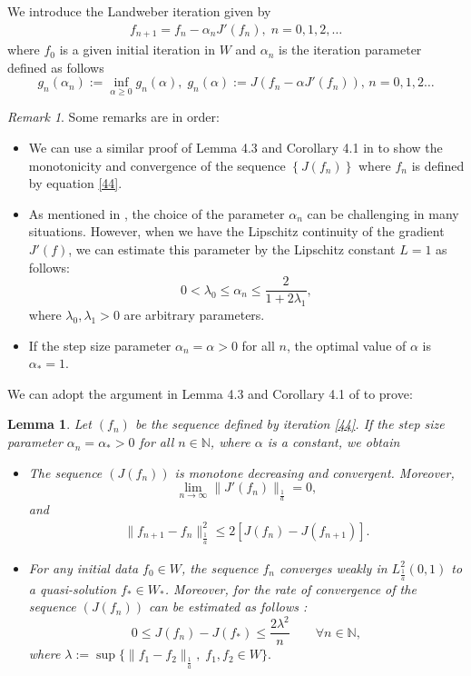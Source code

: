 \documentclass[reqno]{amsart}
\theoremstyle{plain}
\newtheorem{lemma}[theorem]{Lemma}
\theoremstyle{remark}
\newtheorem{remark}[theorem]{Remark}
\numberwithin{equation}{section}
\begin{document}
We introduce the Landweber iteration given by
\begin{align}\label{44}
     f_{n+1}=f_{n}-\alpha_n J'(f_n), \; n=0,1,2, \dots
\end{align}
where $f_0$ is a given initial iteration in $W$ and $ \alpha_n$ is the iteration parameter defined as follows
$$ g_n(\alpha_n):=\inf_{\alpha \geq 0}g_n(\alpha), \; g_n(\alpha):=J(f_n-\alpha J'(f_n)),\, n=0,1,2 \dots$$
\begin{remark} Some remarks are in order:
    \begin{itemize}
        \item[(i)] We can use a similar proof of Lemma 4.3 and Corollary 4.1 in \cite{Hassan2007} to show the monotonicity and convergence of the sequence $ \left\lbrace J(f_n)\right\rbrace$ where $f_n$ is defined by equation \eqref{44}. 
        \item[(ii)] As mentioned in \cite{Hassan2007}, the choice of the parameter $\alpha_n$ can be challenging in many situations. However, when we have the Lipschitz continuity of the gradient $J'(f)$, we can estimate this parameter by the Lipschitz constant $L=1$ as follows:
        $$ 0 <\lambda_0 \leqslant \alpha_n \leqslant \frac{2}{1+2\lambda_1},$$
        where $\lambda_0, \lambda_1>0$ are arbitrary parameters.
\item[(iii)] If the step size parameter $\alpha_n=\alpha >0$ for all $n$, the optimal value of $\alpha$ is $\alpha_{*}=1.$
    \end{itemize}
\end{remark}
We can adopt the argument in Lemma 4.3 and  Corollary 4.1 of \cite{Hassan2007} to prove:
\begin{lemma}
    Let $(f_n)$ be the sequence defined by iteration \eqref{44}. If the step size parameter $\alpha_n=\alpha_* >0$ for all $n\in \mathbb N$, where $\alpha$ is a constant, we obtain
    \begin{itemize}
        \item[(i)]
        The sequence $(J(f_n))$ is monotone decreasing and convergent. Moreover,
        $$\lim\limits_{n \rightarrow \infty}\|J'(f_n)\|_{\frac{1}{a}}=0,$$
    and
    \begin{align*}
        \|f_{n+1}-f_n\|_{\frac{1}{a}}^2\leqslant 2\left[J(f_n)-J(f_{n+1})\right].
    \end{align*}
    \item[(ii)] For any initial data $f_0 \in W$, the sequence $f_n $ converges weakly in $L^2_{\frac{1}{a}}(0,1)$ to a quasi-solution $f_* \in W_*$. Moreover, for the rate of convergence of the sequence $ (J(f_n))$  can be estimated as follows :
    $$ 0 \leqslant J(f_n)- J(f_*) \leqslant \frac{2\lambda^2}{n} \qquad \forall n \in \mathbb{N},$$
    where $\lambda:=\sup \{\|f_1-f_2\|_{\frac{1}{a}}, \; f_1, f_2\in W\}.$
    \end{itemize}
\end{lemma}
\end{document}
